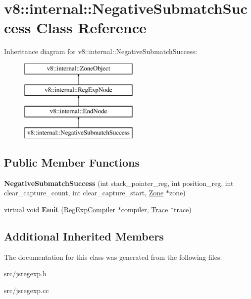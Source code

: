 \hypertarget{classv8_1_1internal_1_1_negative_submatch_success}{}\section{v8\+:\+:internal\+:\+:Negative\+Submatch\+Success Class Reference}
\label{classv8_1_1internal_1_1_negative_submatch_success}
Inheritance diagram for v8\+:\+:internal\+:\+:Negative\+Submatch\+Success\+:\begin{figure}[H]
\begin{center}
\leavevmode
\includegraphics[height=4.000000cm]{classv8_1_1internal_1_1_negative_submatch_success}
\end{center}
\end{figure}
\subsection*{Public Member Functions}
\begin{DoxyCompactItemize}
\item 
\hypertarget{classv8_1_1internal_1_1_negative_submatch_success_a792b6773216be761cb742b6243b7b6e8}{}{\bfseries Negative\+Submatch\+Success} (int stack\+\_\+pointer\+\_\+reg, int position\+\_\+reg, int clear\+\_\+capture\+\_\+count, int clear\+\_\+capture\+\_\+start, \hyperlink{classv8_1_1internal_1_1_zone}{Zone} $\ast$zone)\label{classv8_1_1internal_1_1_negative_submatch_success_a792b6773216be761cb742b6243b7b6e8}

\item 
\hypertarget{classv8_1_1internal_1_1_negative_submatch_success_a5d4dda4dc5337015377c20e40c8e8853}{}virtual void {\bfseries Emit} (\hyperlink{classv8_1_1internal_1_1_reg_exp_compiler}{Reg\+Exp\+Compiler} $\ast$compiler, \hyperlink{classv8_1_1internal_1_1_trace}{Trace} $\ast$trace)\label{classv8_1_1internal_1_1_negative_submatch_success_a5d4dda4dc5337015377c20e40c8e8853}

\end{DoxyCompactItemize}
\subsection*{Additional Inherited Members}


The documentation for this class was generated from the following files\+:\begin{DoxyCompactItemize}
\item 
src/jsregexp.\+h\item 
src/jsregexp.\+cc\end{DoxyCompactItemize}
